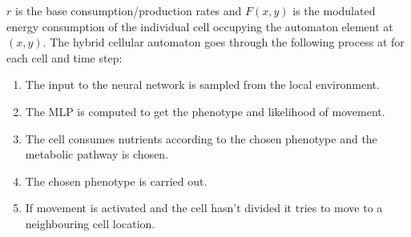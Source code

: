 \documentclass[\main/thesis.tex]{subfiles}
\begin{document}
$r$ is the base consumption/production rates and $F(x, y)$ is the modulated 
energy consumption of the individual cell occupying the automaton element at 
$(x, y)$. The hybrid cellular automaton goes through the following process at 
for each cell and time step:
\begin{enumerate}
  \item The input to the neural network is sampled from the local environment.
  \item The MLP is computed to get the phenotype and likelihood of movement.
  \item The cell consumes nutrients according to the chosen phenotype 
        and the metabolic pathway is chosen.
  \item The chosen phenotype is carried out.
  \item If movement is activated and the cell hasn't divided it tries to move to 
        a neighbouring cell location.
\end{enumerate}
\end{document}
